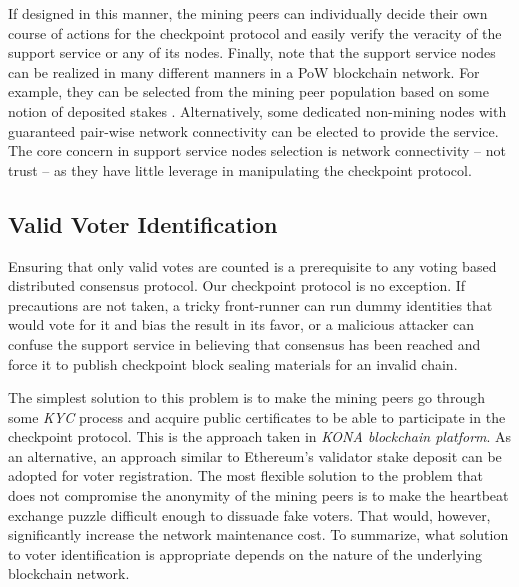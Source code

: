 If designed in this manner, the mining peers can individually decide their own course of actions for the checkpoint protocol and easily verify the veracity of the support service or any of its nodes. Finally, note that the support service nodes can be realized in many different manners in a PoW blockchain network. For example, they can be selected from the mining peer population based on some notion of deposited stakes \cite{casper}. Alternatively, some dedicated non-mining nodes with guaranteed pair-wise network connectivity can be elected to provide the service. The core concern in support service nodes selection is network connectivity -- not trust -- as they have little leverage in manipulating the checkpoint protocol.
   
\subsection{Valid Voter Identification}
Ensuring that only valid votes are counted is a prerequisite to any voting based distributed consensus protocol. Our checkpoint protocol is no exception. If precautions are not taken, a tricky front-runner can run dummy identities that would vote for it and bias the result in its favor, or a malicious attacker can confuse the support service in believing that consensus has been reached and force it to publish checkpoint block sealing materials for an invalid chain.

The simplest solution to this problem is to make the mining peers go through some \textit{KYC} process and acquire public certificates to be able to participate in the checkpoint protocol. This is the approach taken in \textit{KONA blockchain platform}. As an alternative, an approach similar to Ethereum's validator stake deposit \cite{casper} can be adopted for voter registration. The most flexible solution to the problem that does not compromise the anonymity of the mining peers is to make the heartbeat exchange puzzle difficult enough to dissuade fake voters. That would, however, significantly increase the network maintenance cost. To summarize, what solution to voter identification is appropriate depends on the nature of the underlying blockchain network.       

